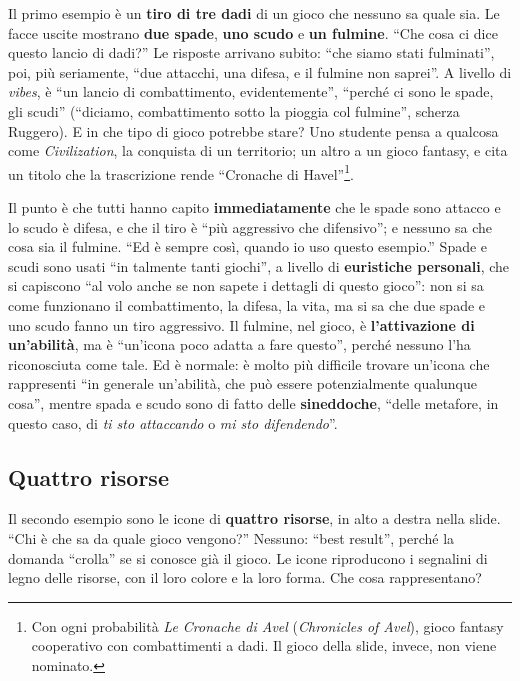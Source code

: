 Il primo esempio è un \textbf{tiro di tre dadi} di un gioco che nessuno sa quale sia.
Le facce uscite mostrano \textbf{due spade}, \textbf{uno scudo} e \textbf{un fulmine}.
``Che cosa ci dice questo lancio di dadi?'' Le risposte arrivano subito: ``che siamo
stati fulminati'', poi, più seriamente, ``due attacchi, una difesa, e il fulmine non
saprei''. A livello di \emph{vibes}, è ``un lancio di combattimento, evidentemente'',
``perché ci sono le spade, gli scudi'' (``diciamo, combattimento sotto la pioggia col
fulmine'', scherza Ruggero). E in che tipo di gioco potrebbe stare? Uno studente pensa a
qualcosa come \emph{Civilization}, la conquista di un territorio; un altro a un gioco
fantasy, e cita un titolo che la trascrizione rende ``Cronache di Havel''\footnote{Con
ogni probabilità \emph{Le Cronache di Avel} (\emph{Chronicles of Avel}), gioco fantasy
cooperativo con combattimenti a dadi. Il gioco della slide, invece, non viene
nominato.}.

Il punto è che tutti hanno capito \textbf{immediatamente} che le spade sono attacco e
lo scudo è difesa, e che il tiro è ``più aggressivo che difensivo''; e nessuno sa che
cosa sia il fulmine. ``Ed è sempre così, quando io uso questo esempio.'' Spade e scudi
sono usati ``in talmente tanti giochi'', a livello di \textbf{euristiche personali}, che
si capiscono ``al volo anche se non sapete i dettagli di questo gioco'': non si sa come
funzionano il combattimento, la difesa, la vita, ma si sa che due spade e uno scudo
fanno un tiro aggressivo. Il fulmine, nel gioco, è \textbf{l'attivazione di
un'abilità}, ma è ``un'icona poco adatta a fare questo'', perché nessuno l'ha
riconosciuta come tale. Ed è normale: è molto più difficile trovare un'icona che
rappresenti ``in generale un'abilità, che può essere potenzialmente qualunque cosa'',
mentre spada e scudo sono di fatto delle \textbf{sineddoche}, ``delle metafore, in
questo caso, di \emph{ti sto attaccando} o \emph{mi sto difendendo}''.

\subsection{Quattro risorse}

Il secondo esempio sono le icone di \textbf{quattro risorse}, in alto a destra nella
slide. ``Chi è che sa da quale gioco vengono?'' Nessuno: ``best result'', perché la
domanda ``crolla'' se si conosce già il gioco. Le icone riproducono i segnalini di
legno delle risorse, con il loro colore e la loro forma. Che cosa rappresentano?

